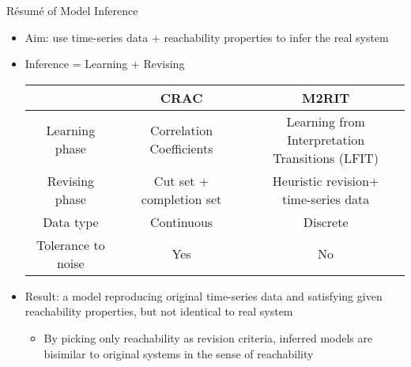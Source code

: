 \documentclass[8pt]{beamer}
\begin{document}
\begin{frame}{R\'esum\'e of Model Inference}    
\begin{itemize}
\item Aim: use time-series data + reachability properties to infer the real system
\pause
\item Inference = Learning + Revising
\pause
\begin{tabular}{c|c|c}
     &CRAC & M2RIT \\
     \hline
    Learning phase & Correlation Coefficients & \makecell{Learning from Interpretation\\ Transitions (LFIT)}
    \pause\\
     \hline
     Revising phase & \makecell{Cut set +\\ completion set} & \makecell{Heuristic revision+\\time-series data}
     \pause\\
     \hline
     Data type &Continuous & Discrete
     \pause\\
     \hline
     \makecell{Tolerance to\\ noise}&Yes&No
\end{tabular}
\pause
\item Result: a model reproducing original time-series data and satisfying given reachability properties, but not identical to real system
\pause
\begin{itemize}
    \item By picking only reachability as revision criteria, inferred models are bisimilar to original systems in the sense of reachability
\end{itemize}
\end{itemize}
\end{frame}
\end{document}

